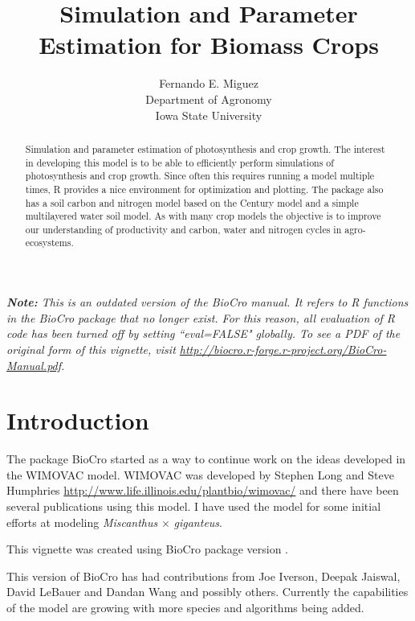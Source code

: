 \documentclass[12pt]{article}\usepackage[]{graphicx}\usepackage[]{color}
\title{Simulation and Parameter Estimation for Biomass Crops}
\author{Fernando E. Miguez\\Department of Agronomy\\
  Iowa State University}
\begin{document}
\newcommand{\code}[1]{\texttt{\small{#1}}}
\newcommand{\package}[1]{\textsf{\small{#1}}}
\maketitle

\noindent\emph{\textbf{Note:} This is an outdated version of the
BioCro manual.  It refers to R functions in the BioCro package that no
longer exist.  For this reason, all evaluation of R code has been
turned off by setting ``eval=FALSE" globally.  To see a PDF of the
original form of this vignette, visit
\url{http://biocro.r-forge.r-project.org/BioCro-Manual.pdf}.}

\begin{abstract}
  Simulation and parameter estimation of photosynthesis and crop
  growth. The interest in developing this model is to be able to
  efficiently perform simulations of photosynthesis and crop
  growth. Since often this requires running a model multiple times, R
  provides a nice environment for optimization and plotting. The
  package also has a soil carbon and nitrogen model based on the
  Century model and a simple multilayered water soil model. As with
  many crop models the objective is to improve our understanding of
  productivity and carbon, water and nitrogen cycles in
  agro-ecosystems.
\end{abstract}

\tableofcontents



\section{Introduction}

The package \package{BioCro} started as a way to continue work on the
ideas developed in the WIMOVAC model. WIMOVAC was developed by Stephen
Long and Steve Humphries
\url{http://www.life.illinois.edu/plantbio/wimovac/} and there have been
several publications using this model. I have used the model for some
initial efforts at modeling \emph{Miscanthus} $\times$ \emph{giganteus}.

This vignette was created using BioCro package version
.

This version of \package{BioCro} has had contributions from Joe
Iverson, Deepak Jaiswal, David LeBauer and Dandan Wang and possibly
others.  Currently the capabilities of the model are growing with more
species and algorithms being added.
\end{document}
